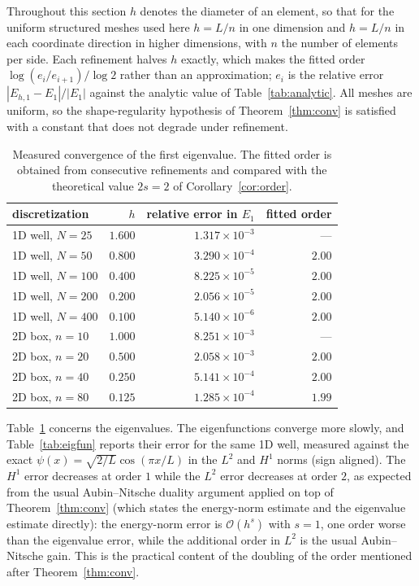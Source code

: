 \documentclass[pdflatex,sn-mathphys-num]{sn-jnl}
\theoremstyle{thmstyleone}%
\theoremstyle{thmstyletwo}%
\theoremstyle{thmstylethree}%
\begin{document}
Throughout this section $h$ denotes the diameter of an element, so that for the
uniform structured meshes used here $h = L/n$ in one dimension and $h = L/n$ in
each coordinate direction in higher dimensions, with $n$ the number of elements
per side. Each refinement halves $h$ exactly, which makes the fitted order
$\log(e_i/e_{i+1})/\log 2$ rather than an approximation; $e_i$ is the relative
error $|E_{h,1}-E_1|/|E_1|$ against the analytic value of
Table~\ref{tab:analytic}. All meshes are uniform, so the shape-regularity
hypothesis of Theorem~\ref{thm:conv} is satisfied with a constant that does not
degrade under refinement.

\begin{table}[t]
\caption{Measured convergence of the first eigenvalue. The fitted order is
obtained from consecutive refinements and compared with the theoretical value
$2s = 2$ of Corollary~\ref{cor:order}.}\label{tab:conv}
\begin{tabular}{@{}lrrr@{}}
\toprule
discretization & $h$ & relative error in $E_1$ & fitted order \\
\midrule
1D well, $N=25$   & $1.600$  & $1.317\times10^{-3}$ & --- \\
1D well, $N=50$   & $0.800$  & $3.290\times10^{-4}$ & $2.00$ \\
1D well, $N=100$  & $0.400$  & $8.225\times10^{-5}$ & $2.00$ \\
1D well, $N=200$  & $0.200$  & $2.056\times10^{-5}$ & $2.00$ \\
1D well, $N=400$  & $0.100$  & $5.140\times10^{-6}$ & $2.00$ \\
\midrule
2D box, $n=10$    & $1.000$  & $8.251\times10^{-3}$ & --- \\
2D box, $n=20$    & $0.500$  & $2.058\times10^{-3}$ & $2.00$ \\
2D box, $n=40$    & $0.250$  & $5.141\times10^{-4}$ & $2.00$ \\
2D box, $n=80$    & $0.125$  & $1.285\times10^{-4}$ & $1.99$ \\
\bottomrule
\end{tabular}
\end{table}

Table~\ref{tab:conv} concerns the eigenvalues. The eigenfunctions converge more
slowly, and Table~\ref{tab:eigfun} reports their error for the same 1D well,
measured against the exact $\psi(x) = \sqrt{2/L}\cos(\pi x/L)$ in the $L^2$ and
$H^1$ norms (sign aligned). The $H^1$ error decreases at order $1$ while the
$L^2$ error decreases at order $2$, as expected from the usual Aubin--Nitsche
duality argument applied on top of Theorem~\ref{thm:conv} (which states the
energy-norm estimate and the eigenvalue estimate directly):
the energy-norm error is $\mathcal{O}(h^{s})$ with $s = 1$, one order worse than
the eigenvalue error, while the additional order in $L^2$ is the usual
Aubin--Nitsche gain. This is the practical content of the doubling of the order
mentioned after Theorem~\ref{thm:conv}.
\end{document}
